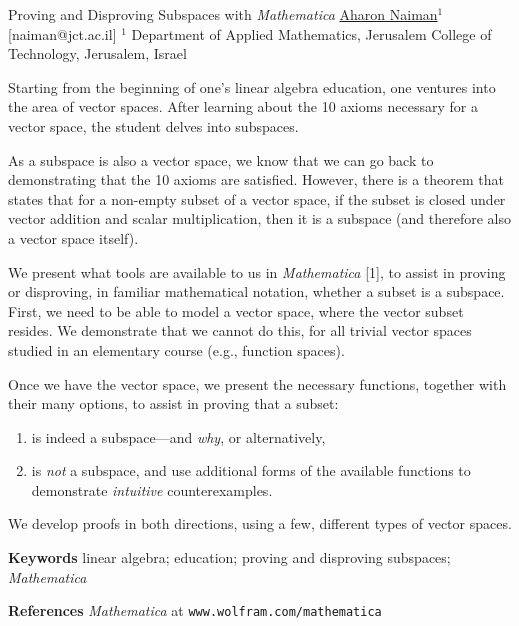 


\begin{abstract_online}{Proving and Disproving Subspaces with \emph{Mathematica}}{%
        \underline{Aharon Naiman}$^{1}$}{[naiman@jct.ac.il]
        }{%
        $^1$ Department of Applied Mathematics, Jerusalem College of
    Technology, Jerusalem, Israel}

Starting from the beginning of one's linear algebra education, one
ventures into the area of vector spaces.  After learning about the 10
axioms necessary for a vector space, the student delves into
subspaces.

As a subspace is also a vector space, we know that we can go back to
demonstrating that the 10 axioms are satisfied.  However, there is a
theorem that states that for a non-empty subset of a vector space, if
the subset is closed under vector addition and scalar multiplication,
then it is a subspace (and therefore also a vector space itself).

We present what tools are available to us in \emph{Mathematica} [1],
to assist in proving or disproving, in familiar mathematical notation,
whether a subset is a subspace.  First, we need to be able to model a
vector space, where the vector subset resides.  We demonstrate that we
cannot do this, for all trivial vector spaces studied in an elementary
course (e.g., function spaces).

Once we have the vector space, we present the necessary functions,
together with their many options, to assist in proving that a subset:
%
\begin{enumerate}
    \item is indeed a subspace---and \emph{why}, or alternatively,
    \item is \emph{not} a subspace, and use additional forms of the
          available functions to demonstrate \emph{intuitive}
          counterexamples.
\end{enumerate}

We develop proofs in both directions, using a few, different types of
vector spaces.

\textbf{Keywords} \newline{} linear algebra; education; proving and
disproving subspaces; \emph{Mathematica}

\textbf{References} \newline{}
\emph{Mathematica} at \texttt{www.wolfram.com/mathematica} \newline{}
\end{abstract_online}
    
